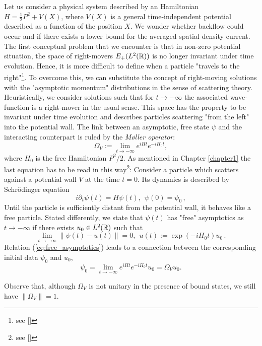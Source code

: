 Let us consider a physical system described by an Hamiltonian $H=\frac{1}{2}P^2+V(X)$, where $V(X)$ is a general time-independent potential described as a function of the position $X$. We wonder whether backflow could occur and if there exists a lower bound for the averaged spatial density current. The first conceptual problem that we encounter is that in non-zero potential situation, the space of right-movers $E_+(L^2({\mathbb R}))$ is no longer invariant under time evolution. Hence, it is more difficult to define when a particle "travels to the right"\footnote{see [\citealp[Sect. III]{gand}]}. To overcome this, we can substitute the concept of right-moving solutions with the "asymptotic momentum" distributions in the sense of scattering theory. Heuristically, we consider solutions such that for $t\to-\infty$ the associated wave-function is a right-mover in the usual sense. This space has the property to be invariant under time evolution and describes particles scattering "from the left" into the potential wall. The link between an asymptotic, free state $\psi$ and the interacting counterpart is ruled by the \textit{M\o{}ller operator}:
\begin{equation}
\Omega_V:=\lim_{t\to-\infty}e^{iHt}e^{-iH_0t},
\end{equation}
where $H_0$ is the free Hamiltonian $P^2/2$. As mentioned in Chapter \ref{chapter1} the last equation has to be read in this way\footnote{see [\citealp[Chapt. 0, Sect. 4]{scattering}]}: Consider a particle which scatters against a potential wall $V$ at the time $t=0$. Its dynamics is described by Schr\"{o}dinger equation
\begin{equation}
	i\partial_t\psi(t)=H\psi(t),\ \ \psi(0)=\psi_0\, ,
\end{equation}
Until the particle is sufficiently distant from the potential wall, it behaves like a free particle. Stated differently, we state that $\psi(t)$ has "free" asymptotics as $t\to-\infty$ if there exists $u_0\in L^2({\mathbb R})$ such that
\begin{equation}
	\lim_{t\to-\infty}\|\psi(t)-u(t)\|=0,\ \ u(t):=\exp(-iH_0t)u_0\, .
	\label{eq:free_asymptotics}
\end{equation}
Relation (\ref{eq:free_asymptotics}) leads to a connection between the corresponding initial data $\psi_0$ and $u_0$,
\begin{equation}
	\psi_0=\lim_{t\to-\infty}e^{iHt}e^{-iH_0t}u_0=\Omega_Vu_0.
\end{equation}
\begin{oss}
	Observe that, although $\Omega_V$ is not unitary in the presence of bound states, we still have $\|\Omega_V\| = 1$.\\
\end{oss} 

